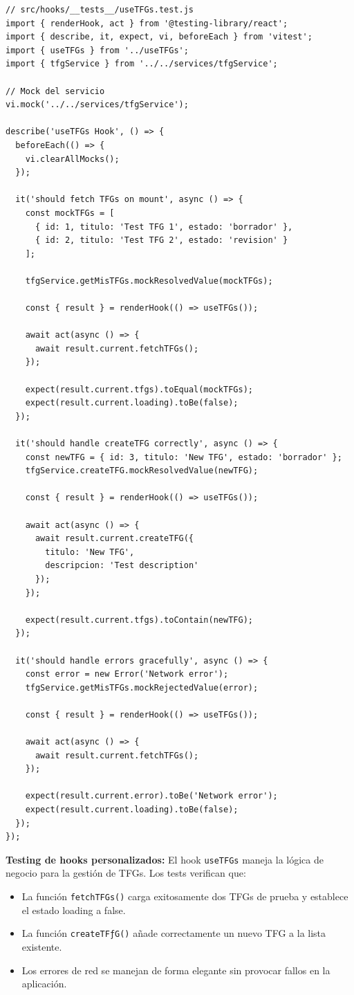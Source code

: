 \documentclass[12pt,a4paper,oneside]{report}
\begin{document}
\begin{lstlisting}
// src/hooks/__tests__/useTFGs.test.js
import { renderHook, act } from '@testing-library/react';
import { describe, it, expect, vi, beforeEach } from 'vitest';
import { useTFGs } from '../useTFGs';
import { tfgService } from '../../services/tfgService';

// Mock del servicio
vi.mock('../../services/tfgService');

describe('useTFGs Hook', () => {
  beforeEach(() => {
    vi.clearAllMocks();
  });

  it('should fetch TFGs on mount', async () => {
    const mockTFGs = [
      { id: 1, titulo: 'Test TFG 1', estado: 'borrador' },
      { id: 2, titulo: 'Test TFG 2', estado: 'revision' }
    ];

    tfgService.getMisTFGs.mockResolvedValue(mockTFGs);

    const { result } = renderHook(() => useTFGs());

    await act(async () => {
      await result.current.fetchTFGs();
    });

    expect(result.current.tfgs).toEqual(mockTFGs);
    expect(result.current.loading).toBe(false);
  });

  it('should handle createTFG correctly', async () => {
    const newTFG = { id: 3, titulo: 'New TFG', estado: 'borrador' };
    tfgService.createTFG.mockResolvedValue(newTFG);

    const { result } = renderHook(() => useTFGs());

    await act(async () => {
      await result.current.createTFG({
        titulo: 'New TFG',
        descripcion: 'Test description'
      });
    });

    expect(result.current.tfgs).toContain(newTFG);
  });

  it('should handle errors gracefully', async () => {
    const error = new Error('Network error');
    tfgService.getMisTFGs.mockRejectedValue(error);

    const { result } = renderHook(() => useTFGs());

    await act(async () => {
      await result.current.fetchTFGs();
    });

    expect(result.current.error).toBe('Network error');
    expect(result.current.loading).toBe(false);
  });
});
\end{lstlisting}

\textbf{Testing de hooks personalizados:} El hook \texttt{useTFGs} maneja la lógica de negocio para la gestión de TFGs. Los tests verifican que:
\begin{itemize}
\item La función \texttt{fetchTFGs()} carga exitosamente dos TFGs de prueba y establece el estado loading a false.
\item La función \texttt{createTFƒG()} añade correctamente un nuevo TFG a la lista existente.
\item Los errores de red se manejan de forma elegante sin provocar fallos en la aplicación.
\end{itemize}
\end{document}
